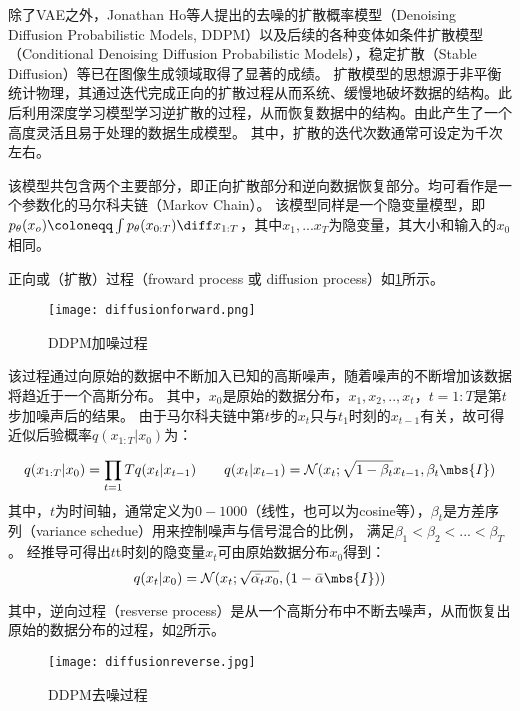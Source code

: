 除了VAE之外，Jonathan Ho等人提出的去噪的扩散概率模型\cite{DDPM}（Denoising Diffusion Probabilistic Models, DDPM）以及后续的各种变体如条件扩散模型\cite{CondDDPM}（Conditional Denoising Diffusion Probabilistic Models），稳定扩散\cite{StableDiffusion}（Stable Diffusion）等已在图像生成领域取得了显著的成绩。
扩散模型的思想源于非平衡统计物理，其通过迭代完成正向的扩散过程从而系统、缓慢地破坏数据的结构。此后利用深度学习模型学习逆扩散的过程，从而恢复数据中的结构。由此产生了一个高度灵活且易于处理的数据生成模型。
其中，扩散的迭代次数通常可设定为千次左右。

该模型共包含两个主要部分，即正向扩散部分和逆向数据恢复部分。均可看作是一个参数化的马尔科夫链（Markov Chain）。
该模型同样是一个隐变量模型，即$p_\theta(x_o) \coloneqq \int p_\theta(x_{0:T})\diff x_{1:T}$，其中$x_1,...x_T$为隐变量，其大小和输入的$x_0$相同。

正向或（扩散）过程（froward process 或 diffusion process）如\cref{figure:Diffusionforward}所示。

\begin{figure}[h]
  \texttt{[image: diffusionforward.png]}
  \caption{DDPM加噪过程}
  \label{figure:Diffusionforward}
\end{figure}

该过程通过向原始的数据中不断加入已知的高斯噪声，随着噪声的不断增加该数据将趋近于一个高斯分布。
其中，$x_0$是原始的数据分布，$x_1, x_2,..,x_t$，$t=1:T$是第$t$步加噪声后的结果。
由于马尔科夫链中第$t$步的$x_t$只与$t_1$时刻的$x_{t-1}$有关，故可得近似后验概率$q(x_{1:T}|x_0)$为：

\begin{equation}
  \centering
  q(x_{1:T}|x_0) = \prod_{t=1}{T} q(x_t|x_{t-1}) \qquad
  q(x_t|x_{t-1}) = \mathcal{N}(x_t; \sqrt{1-\beta_t}x_{t-1}, \beta_t\mbs{I})
\end{equation}
其中，$t$为时间轴，通常定义为$0-1000$（线性，也可以为cosine等），$\beta_t$是方差序列（variance schedue）用来控制噪声与信号混合的比例，
满足$\beta_1 < \beta_2 <...<\beta_T$。
经推导\cite{DDPM}可得出$t$t时刻的隐变量$x_t$可由原始数据分布$x_0$得到：
\begin{equation}
  \centering
  q(x_t|x_0) = \mathcal{N}(x_t; \sqrt{\bar{\alpha_t}x_0}, (1-\bar{\alpha}\mbs{I}))
\end{equation}

其中，逆向过程（resverse process）是从一个高斯分布中不断去噪声，从而恢复出原始的数据分布的过程，如\cref{figure:Diffusionreverse}所示。

\begin{figure}[h]
  \centering
  \texttt{[image: diffusionreverse.jpg]}
  \caption{DDPM去噪过程}
  \label{figure:Diffusionreverse}
\end{figure}

